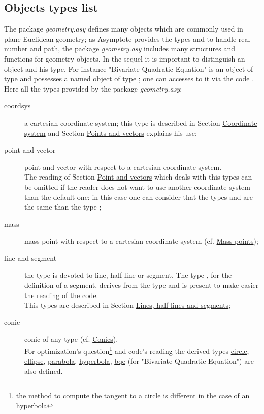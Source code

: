 \documentclass[pdftex]{article}
\newcommand{\geo}{the package \emph{geometry.asy}\xspace}
\newcommand{\Geo}{The package \emph{geometry.asy}\xspace}
\begin{document}
\subsection{Objects types list}
\Geo defines many objects which are commonly used in plane Euclidean geometry;
as Asymptote provides the types  and  to handle real number and
path, \geo includes many structures and functions for geometry objects.
In the sequel it is important to distinguish an object and his type.
For instance  "Bivariate Quadratic Equation" is an object of type 
and possesses a named object  of type ; one can
accesses to it via the code  .\\
Here all the types provided by \geo:
\begin{description}
\item[coordsys] a cartesian coordinate system;
  this type is described in Section
  \href{#section.coordsys}{Coordinate system} and
  Section  \href{#section.point}{Points and vectors} explains his use;
\item[point \textmd{and} vector] point and
  vector with respect to a cartesian coordinate system.\\
   The reading of Section  \href{#section.point}{Point and vectors}
   which deals with this types can be omitted if the reader does not
   want to use another coordinate system than the default one: in this case one
   can consider that the types  and  are the
   same than the type ;
\item[mass] mass point with respect to a cartesian
  coordinate system   (cf. \href{#section.mass}{Mass points});
\item[line \textmd{and} segment] the type
   is devoted to  line, half-line or  segment.
  The type , for the definition of a segment, derives
  from the type  and is present to make easier the reading
  of the code.\\
  This types are described in Section
  \href{#section.line}{Lines, half-lines and segments};
\item[conic]
  conic of any type (cf. \href{#section.conic}{Conics}).\\
  For optimization's question\footnote{the method to compute the tangent to
    a circle is different in the case of an hyperbola} and code's
  reading the derived types
  \href{#subsection.circle}{circle},
  \href{#subsection.ellipse}{ellipse},
  \href{#subsection.parabola}{parabola},
  \href{#subsection.hyperbola}{hyperbola},
  \href{#subsubsection.bqe}{bqe} (for "Bivariate Quadratic
  Equation") are also defined.


\end{description}
\end{document}
